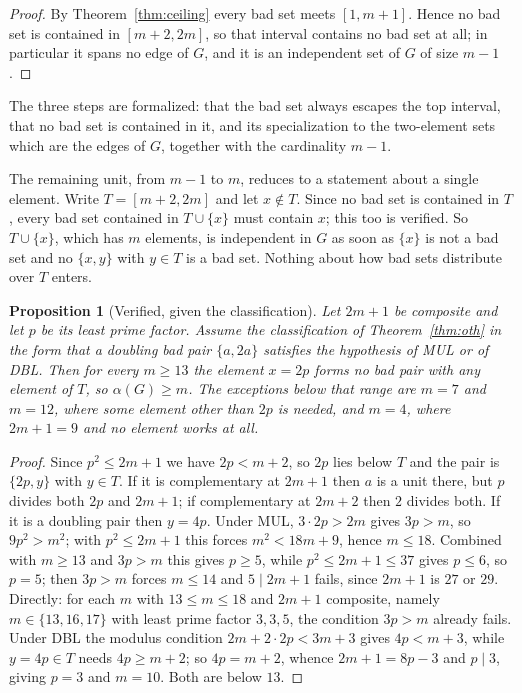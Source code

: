 \documentclass[11pt]{amsart}
\theoremstyle{plain}
\newtheorem{proposition}[theorem]{Proposition}
\theoremstyle{definition}
\begin{document}
\begin{proof}
By Theorem~\ref{thm:ceiling} every bad set meets $[1,m+1]$. Hence no bad set is contained in
$[m+2,2m]$, so that interval contains no bad set at all; in particular it spans no edge of $G$, and
it is an independent set of $G$ of size $m-1$.
\end{proof}

The three steps are formalized: that the bad set always escapes the top interval, that no bad set is
contained in it, and its specialization to the two-element sets which are the edges of $G$, together
with the cardinality $m-1$.

The remaining unit, from $m-1$ to $m$, reduces to a statement about a single element. Write
$T = [m+2,2m]$ and let $x \notin T$. Since no bad set is contained in $T$, every bad set contained in
$T \cup \{x\}$ must contain $x$; this too is verified. So $T \cup \{x\}$, which has $m$ elements, is
independent in $G$ as soon as $\{x\}$ is not a bad set and no $\{x,y\}$ with $y \in T$ is a bad set.
Nothing about how bad sets distribute over $T$ enters.

\begin{proposition}[Verified, given the classification]\label{prop:topgap}
Let $2m+1$ be composite and let $p$ be its least prime factor. Assume the classification of
Theorem~\ref{thm:oth} in the form that a doubling bad pair $\{a,2a\}$ satisfies the hypothesis of
MUL or of DBL. Then for every $m \ge 13$ the element $x = 2p$ forms no bad pair with any element of
$T$, so $\alpha(G) \ge m$. The exceptions below that range are $m = 7$ and $m = 12$, where some
element other than $2p$ is needed, and $m = 4$, where $2m+1 = 9$ and no element works at all.
\end{proposition}

\begin{proof}
Since $p^2 \le 2m+1$ we have $2p < m+2$, so $2p$ lies below $T$ and the pair is $\{2p, y\}$ with
$y \in T$. If it is complementary at $2m+1$ then $a$ is a unit there, but $p$ divides both $2p$ and
$2m+1$; if complementary at $2m+2$ then $2$ divides both. If it is a doubling pair then $y = 4p$.
Under MUL, $3\cdot 2p > 2m$ gives $3p > m$, so $9p^2 > m^2$; with $p^2 \le 2m+1$ this forces
$m^2 < 18m+9$, hence $m \le 18$. Combined with $m \ge 13$ and $3p > m$ this gives $p \ge 5$, while
$p^2 \le 2m+1 \le 37$ gives $p \le 6$, so $p = 5$; then $3p > m$ forces $m \le 14$ and $5 \mid 2m+1$
fails, since $2m+1$ is $27$ or $29$. Directly: for each $m$ with $13 \le m \le 18$ and $2m+1$
composite, namely $m \in \{13,16,17\}$ with least prime factor $3,3,5$, the condition $3p > m$
already fails. Under DBL
the modulus condition $2m + 2\cdot 2p < 3m+3$ gives $4p < m+3$, while $y = 4p \in T$ needs
$4p \ge m+2$; so $4p = m+2$, whence $2m+1 = 8p-3$ and $p \mid 3$, giving $p = 3$ and $m = 10$.
Both are below $13$.
\end{proof}
\end{document}
